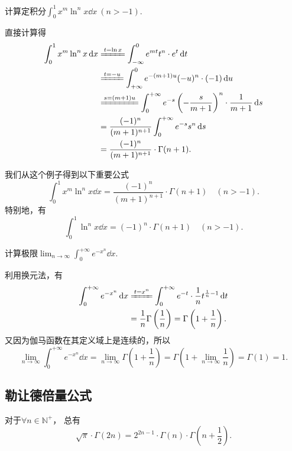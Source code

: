 \begin{example}
计算定积分\(\int_0^1 x^m \ln^n x \dd{x}\ (n>-1)\).
\begin{solution}
直接计算得
\begin{align*}
	\int_0^1 x^m \ln^n x \dd{x}
	&\xlongequal{t=\ln x}
	\int_{-\infty}^0 e^{mt} t^n \cdot e^t \dd{t} \\
	&\xlongequal{t=-u}
	\int_{+\infty}^0 e^{-(m+1)u} (-u)^n \cdot (-1) \dd{u} \\
	&\xlongequal{s=(m+1)u}
	\int_0^{+\infty} e^{-s} \left(-\frac{s}{m+1}\right)^n \cdot \frac{1}{m+1} \dd{s} \\
	&=
	\frac{(-1)^n}{(m+1)^{n+1}} \int_0^{+\infty} e^{-s} s^n \dd{s} \\
	&=
	\frac{(-1)^n}{(m+1)^{n+1}} \cdot \Gamma(n+1).
\end{align*}
\end{solution}
\end{example}
我们从这个例子得到以下重要公式
\begin{equation}
	\int_0^1 x^m \ln^n x \dd{x}
	= \frac{(-1)^n}{(m+1)^{n+1}} \cdot \Gamma(n+1)
	\quad(n>-1).
\end{equation}
特别地，有
\begin{equation}
	\int_0^1 \ln^n x \dd{x}
	= (-1)^n \cdot \Gamma(n+1)
	\quad(n>-1).
\end{equation}

\begin{example}
计算极限\(\lim_{n\to\infty} \int_0^{+\infty} e^{-x^n} \dd{x}\).
\begin{solution}
利用换元法，有\begin{align*}
	\int_0^{+\infty} e^{-x^n} \dd{x}
	&\xlongequal{t=x^n}
	\int_0^{+\infty} e^{-t} \cdot \frac{1}{n} t^{\frac{1}{n}-1} \dd{t} \\
	&= \frac{1}{n} \Gamma\left(\frac{1}{n}\right)
	= \Gamma\left(1+\frac{1}{n}\right).
\end{align*}
又因为伽马函数在其定义域上是连续的，所以\[
	\lim_{n\to\infty} \int_0^{+\infty} e^{-x^n} \dd{x}
	= \lim_{n\to\infty} \Gamma\left(1+\frac{1}{n}\right)
	= \Gamma\left(1+\lim_{n\to\infty} \frac{1}{n}\right)
	= \Gamma(1) = 1.
\]
\end{solution}
\end{example}

\subsection{勒让德倍量公式}
\begin{theorem}[勒让德倍量公式]
对于\(\forall n\in\mathbb{N}^+\)，
总有\begin{equation}\label{equation:定积分.勒让德倍量公式}
\sqrt{\pi} \cdot \Gamma(2n)
= 2^{2n-1} \cdot \Gamma(n) \cdot \Gamma\left(n+\frac{1}{2}\right).
\end{equation}
\end{theorem}

